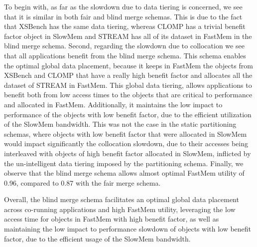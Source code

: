 To begin with, as far as the slowdown due to data tiering is concerned, we see that it is similar in both fair and blind merge schemas. This is due to the fact that XSBench has the same data tiering, whereas CLOMP has a trivial benefit factor object in SlowMem and STREAM has all of its dataset in FastMem in the blind merge schema. 
Second, regarding the slowdown due to collocation we see that all applications benefit from the blind merge schema. This schema enables the optimal global data placement, because it keeps in FastMem the objects from XSBench and CLOMP that have a really high benefit factor and allocates all the dataset of STREAM in FastMem. This global data tiering, allows applications to benefit both from low access times to the objects that are critical to performance and allocated in FastMem. Additionally, it maintains the low impact to performance of the objects with low benefit factor, due to the efficient utilization of the SlowMem bandwidth. This was not the case in the static partitioning schemas, where objects with low benefit factor that were allocated in SlowMem would impact significantly the collocation slowdown, due to their accesses being interleaved with objects of high benefit factor allocated in SlowMem, inflicted by the un-intelligent data tiering imposed by the partitioning schema. Finally, we observe that the blind merge schema allows almost optimal FastMem utility of 0.96, compared to 0.87 with the fair merge schema. 

Overall, the blind merge schema facilitates an optimal global data placement across co-running applications and high FastMem utility, leveraging the low access time for objects in FastMem with high benefit factor, as well as maintaining the low impact to performance slowdown of objects with low benefit factor, due to the efficient usage of the SlowMem bandwidth.\\

\vspace{1.5ex}
\vspace{0.3ex} 

